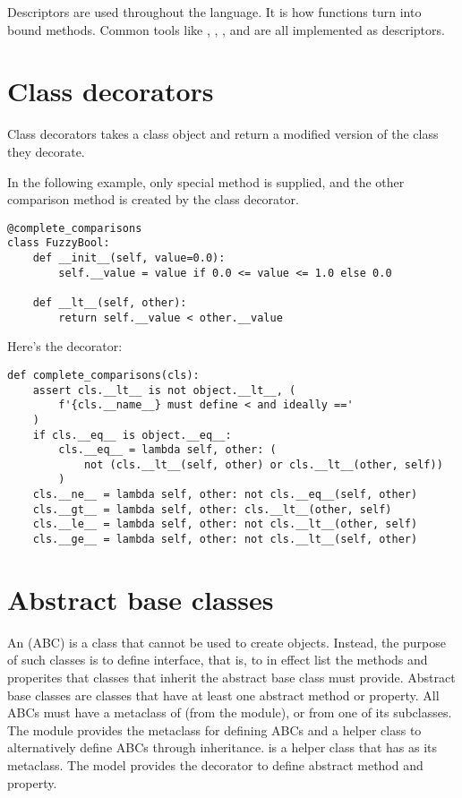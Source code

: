 Descriptors are used throughout the language.
It is how functions turn into bound methods.
Common tools like , , , and  are all implemented as descriptors.


\section{Class decorators}
\label{sec:class-decorators}


Class decorators takes a class object and return a modified version of the class they decorate.



In the following example, only  special method is supplied, and the other comparison method is created by the class decorator.
\begin{lstlisting}
@complete_comparisons
class FuzzyBool:
    def __init__(self, value=0.0):
        self.__value = value if 0.0 <= value <= 1.0 else 0.0

    def __lt__(self, other):
        return self.__value < other.__value
\end{lstlisting}


Here's the decorator:
\begin{lstlisting}
def complete_comparisons(cls):
    assert cls.__lt__ is not object.__lt__, (
        f'{cls.__name__} must define < and ideally =='
    )
    if cls.__eq__ is object.__eq__:
        cls.__eq__ = lambda self, other: (
            not (cls.__lt__(self, other) or cls.__lt__(other, self))
        )
    cls.__ne__ = lambda self, other: not cls.__eq__(self, other)
    cls.__gt__ = lambda self, other: cls.__lt__(other, self)
    cls.__le__ = lambda self, other: not cls.__lt__(other, self)
    cls.__ge__ = lambda self, other: not cls.__lt__(self, other)
\end{lstlisting}

\section{Abstract base classes}
\label{sec:abstr-base-class}


An  (ABC) is a class that cannot be used to create objects.
Instead, the purpose of such classes is to define interface, that is, to in effect list the methods and properites that classes that inherit the abstract base class must provide.
Abstract base classes are classes that have at least one abstract method or property.
All ABCs must have a metaclass of  (from the  module), or from one of its subclasses.
The  module provides the metaclass  for defining ABCs and a helper class  to alternatively define ABCs through inheritance.
 is a helper class that has  as its metaclass.
The  model provides the  decorator to define abstract method and property.




